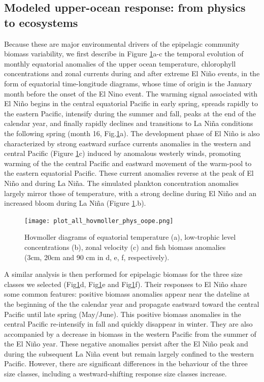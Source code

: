\subsection{Modeled upper-ocean response: from physics to ecosystems}

Because these are major environmental drivers of the epipelagic community biomass variability, we first describe in Figure \ref{fig:hov_nemo_ape}a-c the temporal evolution of monthly equatorial anomalies of the upper ocean temperature, chlorophyll concentrations and zonal currents during and after extreme El Niño events, in the form of equatorial time-longitude diagrams, whose time of origin is the January month before the onset of the El Nino event. The warming signal associated with El Niño begins in the central equatorial Pacific in early spring, spreads rapidly to the eastern Pacific, intensify during the summer and fall, peaks at the end of the calendar year, and finally rapidly declines and transitions to La Niña conditions the following spring (month 16, Fig.\ref{fig:hov_nemo_ape}a). The development phase of El Niño is also characterized by strong  eastward surface currents anomalies in the western and central Pacific (Figure \ref{fig:hov_nemo_ape}c) induced by anomalous westerly winds, promoting warming of the the central Pacific and eastward movement of the warm-pool to the eastern equatorial Pacific. These current anomalies reverse at the peak of El Niño and during La Niña. The simulated plankton concentration anomalies largely mirror those of temperature, with a strong decline during El Niño and an increased bloom during La Niña (Figure \ref{fig:hov_nemo_ape}.b). 

\begin{figure}[h!tp]
	\centering
	\texttt{[image: plot\_all\_hovmoller\_phys\_oope.png]}	
	\caption{Hovmoller diagrams of equatorial temperature (a), low-trophic level concentrations (b), zonal velocity (c) and fish biomass anomalies (3cm, 20cm and 90 cm in d, e, f, respectively).}	
	\label{fig:hov_nemo_ape}
\end{figure}

A similar analysis is then performed for epipelagic biomass for the three size classes we selected (Fig\ref{fig:hov_nemo_ape}d, Fig\ref{fig:hov_nemo_ape}e and Fig\ref{fig:hov_nemo_ape}f). Their responses to El Niño share some common features: positive biomass anomalies appear near the dateline at the beginning of the the calendar year and propagate eastward toward the central Pacific until late spring (May/June). This positive biomass anomalies in the central Pacific re-intensify in fall and quickly disappear in winter. They are also accompanied by a decrease in biomass in the western Pacific from the summer of the El Niño year. These negative anomalies persist after the El Niño peak and during the subsequent La Niña event but remain largely confined to the western Pacific. However, there are significant differences in the behaviour of the three size classes, including a westward-shifting response size classes increase.

